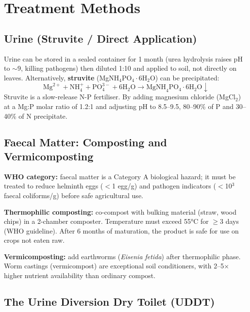 \documentclass[12pt,a4paper,openany]{book}
\begin{document}
\section{Treatment Methods}

\subsection{Urine (Struvite / Direct Application)}

Urine can be stored in a sealed container for 1 month (urea hydrolysis raises pH to $\sim$9, killing pathogens) then diluted 1:10 and applied to soil, not directly on leaves. Alternatively, \textbf{struvite} (MgNH$_4$PO$_4\cdot$6H$_2$O) can be precipitated:
\begin{equation}
  \text{Mg}^{2+} + \text{NH}_4^+ + \text{PO}_4^{3-} + 6\text{H}_2\text{O} \to \text{MgNH}_4\text{PO}_4\cdot6\text{H}_2\text{O} \downarrow
\end{equation}
Struvite is a slow-release N-P fertiliser. By adding magnesium chloride (MgCl$_2$) at a Mg:P molar ratio of 1.2:1 and adjusting pH to 8.5--9.5, 80--90\% of P and 30--40\% of N precipitate.

\subsection{Faecal Matter: Composting and Vermicomposting}

\textbf{WHO category:} faecal matter is a Category A biological hazard; it must be treated to reduce helminth eggs ($<$1 egg/g) and pathogen indicators ($<$10$^3$ faecal coliforms/g) before safe agricultural use.

\textbf{Thermophilic composting:} co-compost with bulking material (straw, wood chips) in a 2-chamber composter. Temperature must exceed 55°C for $\geq$3 days (WHO guideline). After 6 months of maturation, the product is safe for use on crops not eaten raw.

\textbf{Vermicomposting:} add earthworms (\textit{Eisenia fetida}) after thermophilic phase. Worm castings (vermicompost) are exceptional soil conditioners, with 2--5$\times$ higher nutrient availability than ordinary compost.

\subsection{The Urine Diversion Dry Toilet (UDDT)}
\end{document}
